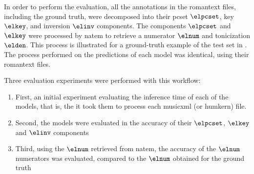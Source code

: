 
In order to perform the evaluation, all the annotations in
the \gls{romantext} files, including the ground truth, were
decomposed into their \gls{pcset} $\elpcset$, key $\elkey$,
and inversion $\elinv$ components. The components $\elpcset$
and $\elkey$ were processed by \gls{natem} to retrieve a
numerator $\elnum$ and tonicization $\elden$. This process
is illustrated for a ground-truth example of the test set in
. The process performed on the
predictions of each model was identical, using their
\gls{romantext} files.

Three evaluation experiments were performed with this
workflow:
\begin{enumerate}
    \item First, an initial experiment evaluating the
    inference time of each of the models, that is, the it
    took them to process each \gls{musicxml} (or
    \gls{humkern}) file.
    \item Second, the models were evaluated in the accuracy
    of their $\elpcset$, $\elkey$ and $\elinv$ components
    \item Third, using the $\elnum$ retrieved from
    \gls{natem}, the accuracy of the $\elnum$ numerators was
    evaluated, compared to the $\elnum$ obtained for the
    ground truth
\end{enumerate}




